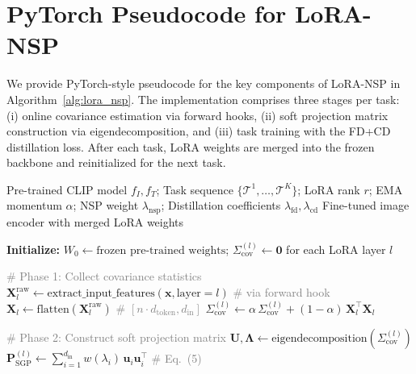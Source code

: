 \documentclass{article}
\begin{document}
\section{PyTorch Pseudocode for LoRA-NSP}
\label{app:pseudocode}

We provide PyTorch-style pseudocode for the key components of LoRA-NSP in Algorithm~\ref{alg:lora_nsp}. The implementation comprises three stages per task: (i) online covariance estimation via forward hooks, (ii) soft projection matrix construction via eigendecomposition, and (iii) task training with the FD+CD distillation loss. After each task, LoRA weights are merged into the frozen backbone and reinitialized for the next task.

\begin{algorithm}[h]
\caption{LoRA-NSP Training Procedure (PyTorch-style)}
\label{alg:lora_nsp}
\begin{algorithmic}[1]
\Require Pre-trained CLIP model $f_I, f_T$; Task sequence $\{\mathcal{T}^1, \ldots, \mathcal{T}^K\}$; LoRA rank $r$; EMA momentum $\alpha$; NSP weight $\lambda_{\text{nsp}}$; Distillation coefficients $\lambda_{\text{fd}}, \lambda_{\text{cd}}$
\Ensure Fine-tuned image encoder with merged LoRA weights

\State \textbf{Initialize:} $W_0 \leftarrow \text{frozen pre-trained weights}$; $\Sigma_{\text{cov}}^{(l)} \leftarrow \mathbf{0}$ for each LoRA layer $l$

    \State \textcolor{gray}{\# Phase 1: Collect covariance statistics}
        \State $\mathbf{X}_l^{\text{raw}} \leftarrow \text{extract\_input\_features}(\mathbf{x}, \text{layer}=l)$ \textcolor{gray}{\# via forward hook}
        \State $\mathbf{X}_l \leftarrow \text{flatten}(\mathbf{X}_l^{\text{raw}})$ \textcolor{gray}{\# $[n \cdot d_{\text{token}}, d_{\text{in}}]$}
        \State $\Sigma_{\text{cov}}^{(l)} \leftarrow \alpha \, \Sigma_{\text{cov}}^{(l)} + (1-\alpha) \, \mathbf{X}_l^\top \mathbf{X}_l$
    \EndFor

    \State \textcolor{gray}{\# Phase 2: Construct soft projection matrix}
        \State $\mathbf{U}, \boldsymbol{\Lambda} \leftarrow \text{eigendecomposition}(\Sigma_{\text{cov}}^{(l)})$
        \State $\mathbf{P}_{\text{SGP}}^{(l)} \leftarrow \sum_{i=1}^{d_{\text{in}}} w(\lambda_i) \, \mathbf{u}_i \mathbf{u}_i^\top$ \textcolor{gray}{\# Eq.~(5)}
    \EndFor


\end{algorithmic}
\end{algorithm}
\end{document}
